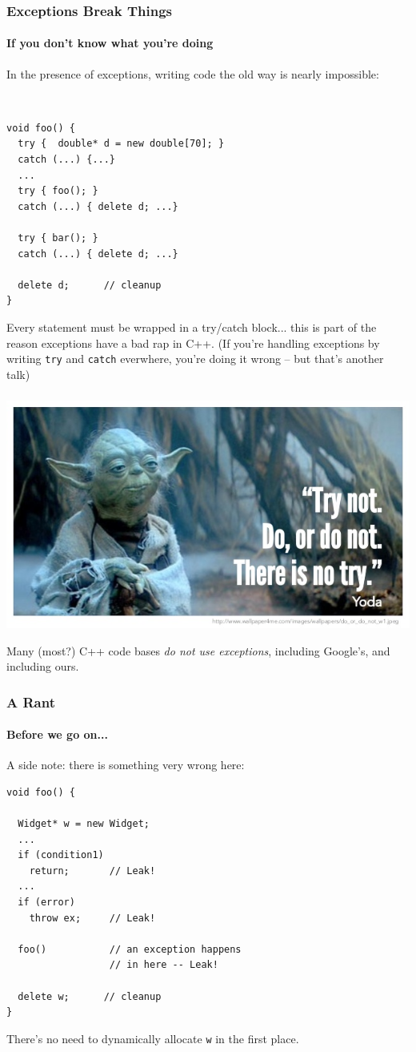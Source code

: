 \begin{frame}[fragile,t]
\frametitle{Exceptions Break Things}
\framesubtitle{If you don't know what you're doing}
In the presence of exceptions, writing code the old way is nearly impossible:
{\scriptsize\
\begin{verbatim}
void foo() {
  try {  double* d = new double[70]; }
  catch (...) {...}
  ...
  try { foo(); }
  catch (...) { delete d; ...}

  try { bar(); } 
  catch (...) { delete d; ...}

  delete d;      // cleanup
}
\end{verbatim}
}
Every statement must be wrapped in a try/catch block... this is part
of the reason exceptions have a bad rap in C++.
\vskip 6pt
(If you're handling exceptions by writing \texttt{try} and \texttt{catch} everwhere,
you're doing it wrong -- but that's another talk)
\end{frame}


\begin{frame}[fragile,t]
\frametitle{}
\includegraphics[scale=0.5]{yoda.jpg}
\begin{center}
Many (most?) C++ code bases \emph{do not use exceptions}, including
Google's, and including ours.
\vskip 6pt
\end{center}
\end{frame}

\begin{frame}[fragile,t]
\frametitle{A Rant}
\framesubtitle{Before we go on...}
A side note: there is something very wrong here:
\pause{}
{\scriptsize \begin{verbatim}
void foo() {

  Widget* w = new Widget;
  ...
  if (condition1)
    return;       // Leak!
  ...
  if (error)
    throw ex;     // Leak!

  foo()           // an exception happens
                  // in here -- Leak!

  delete w;      // cleanup 
}
\end{verbatim}}
\pause
There's no need to dynamically allocate \texttt{w} in the first place.
\vskip 6pt

\end{frame}

